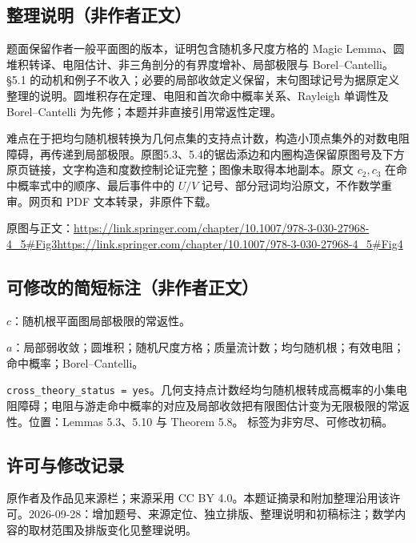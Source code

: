 \documentclass[UTF8,11pt]{ctexart}
\theoremstyle{definition}
\begin{document}
\subsection*{整理说明（非作者正文）}
题面保留作者一般平面图的版本，证明包含随机多尺度方格的 Magic Lemma、圆堆积转译、电阻估计、非三角剖分的有界度增补、局部极限与 Borel--Cantelli。\S5.1 的动机和例子不收入；必要的局部收敛定义保留，末句图球记号为据原定义整理的说明。圆堆积存在定理、电阻和首次命中概率关系、Rayleigh 单调性及 Borel--Cantelli 为先修；本题并非直接引用常返性定理。

难点在于把均匀随机根转换为几何点集的支持点计数，构造小顶点集外的对数电阻障碍，再传递到局部极限。原图5.3、5.4的锯齿添边和内圈构造保留原图号及下方原页链接，文字构造和度数控制论证完整；图像未取得本地副本。原文 $c_2,c_3$ 在命中概率式中的顺序、最后事件中的 $U/V$ 记号、部分冠词均沿原文，不作数学重审。网页和 PDF 文本转录，非原件下载。
\par 原图与正文：\url{https://link.springer.com/chapter/10.1007/978-3-030-27968-4_5#Fig3}\quad\url{https://link.springer.com/chapter/10.1007/978-3-030-27968-4_5#Fig4}
\subsection*{可修改的简短标注（非作者正文）}
$c$：随机根平面图局部极限的常返性。

$a$：局部弱收敛；圆堆积；随机尺度方格；质量流计数；均匀随机根；有效电阻；命中概率；Borel--Cantelli。

\texttt{cross\_theory\_status = yes}。几何支持点计数经均匀随机根转成高概率的小集电阻障碍；电阻与游走命中概率的对应及局部收敛把有限图估计变为无限极限的常返性。位置：Lemmas 5.3、5.10 与 Theorem 5.8。
标签为非穷尽、可修改初稿。
\subsection*{许可与修改记录}
原作者及作品见来源栏；来源采用 CC BY 4.0。本题证摘录和附加整理沿用该许可。2026-09-28：增加题号、来源定位、独立排版、整理说明和初稿标注；数学内容的取材范围及排版变化见整理说明。
\end{document}
